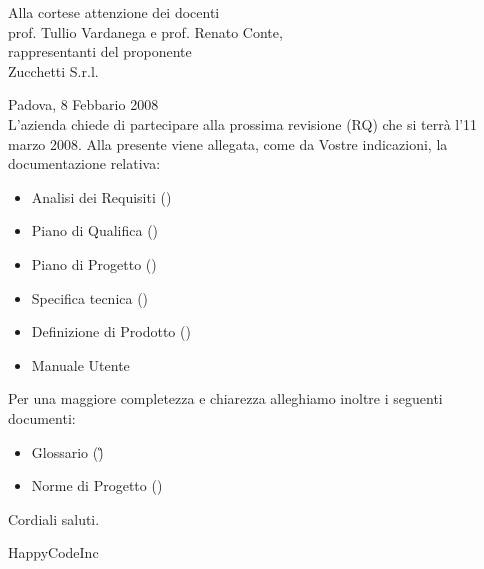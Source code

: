 


\newcommand{\dt}{ Lettera di accompagnamento }%




\thispagestyle{plain}
\begin{flushright}
Alla cortese attenzione dei docenti\\
prof. Tullio Vardanega e prof. Renato Conte,\\
rappresentanti del proponente\\
Zucchetti S.r.l.
\end{flushright}
Padova, 8 Febbario 2008 \\

L'azienda  chiede di partecipare alla prossima revisione (RQ) che si terr\`a l'11 marzo 2008.
Alla presente viene allegata, come da Vostre indicazioni, la documentazione relativa:
\begin{itemize}
\item{}Analisi dei Requisiti (\AR)
\item{}Piano di Qualifica (\PdQ)
\item{}Piano di Progetto (\PdP)
\item{}Specifica tecnica (\ST) 
\item{}Definizione di Prodotto (\DdP)
\item{}Manuale Utente
\end{itemize}
Per una maggiore completezza e chiarezza alleghiamo inoltre i seguenti documenti:
\begin{itemize}
\item{}Glossario (\G)
\item{}Norme di Progetto (\NdP)
\end{itemize}
Cordiali saluti.
\begin{flushright}
HappyCodeInc
\end{flushright}
\newpage


